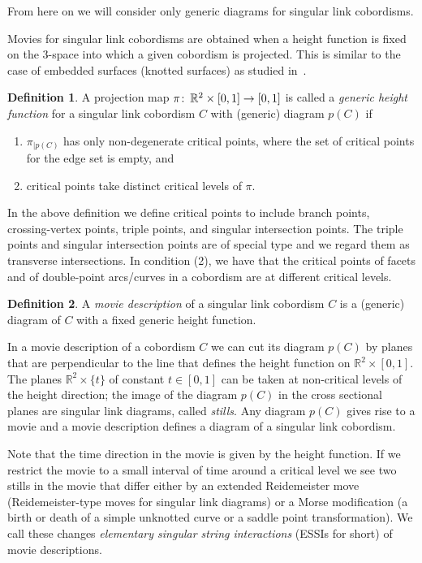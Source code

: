 \documentclass{amsart}\usepackage{amsfonts, amsmath, amssymb}\usepackage{graphicx, epic, epsf, enumerate, stmaryrd}
\theoremstyle{definition}
\newtheorem{definition}{Definition}
\numberwithin{equation}{section}
\begin{document}
From here on we will consider only generic diagrams for singular link cobordisms.

Movies for singular link cobordisms are obtained when a height function is fixed on the 3-space into which a given cobordism is projected. This is similar to the case of embedded surfaces (knotted surfaces) as studied in~\cite{CS}.

\begin{definition}
A projection map $\pi {\colon\thinspace} {\mathbb{R}}^2 \times [0, 1] \to [0, 1]$ is called a \textit{generic height function} for a singular link cobordism $C$ with (generic) diagram $p(C)$ if
\begin{enumerate}
\item $\pi_{\vert p(C)}$ has only non-degenerate critical points, where the set of critical points for the edge set is empty, and
\item critical points take distinct critical levels of $\pi$.
\end{enumerate}
\end{definition}
In the above definition we define critical points to include branch points, crossing-vertex points, triple points, and singular intersection points. The triple points and singular intersection points are of special type and we regard them as transverse intersections. In condition (2), we have that the critical points of facets and of double-point arcs/curves in a cobordism are at different critical levels.

\begin{definition}\label{def:generic height func}
A \textit{movie description} of a singular link cobordism $C$ is a (generic) diagram of $C$ with a fixed generic height function.
\end{definition}

In  a movie description of a cobordism $C$ we can cut its diagram $p(C)$ by planes that are perpendicular to the line that defines the height function on ${\mathbb{R}}^2 \times [0, 1]$. The planes ${\mathbb{R}}^2 \times \{t\}$ of constant $t \in [0, 1]$ can be taken at non-critical levels of the height direction; the image of the diagram $p(C)$ in the cross sectional planes are singular link diagrams, called \textit{stills}. Any diagram $p(C)$ gives rise to a movie and a movie description defines a diagram of a singular link cobordism.

Note that the time direction in the movie is given by the height function. If we restrict the movie to a small interval of time around a critical level we see two stills in the movie that differ either by an extended Reidemeister move (Reidemeister-type moves for singular link diagrams) or a Morse modification (a birth or death of a simple unknotted curve or a saddle point transformation). We call these changes \textit{elementary singular string interactions} (ESSIs for short) of movie descriptions.
\end{document}
